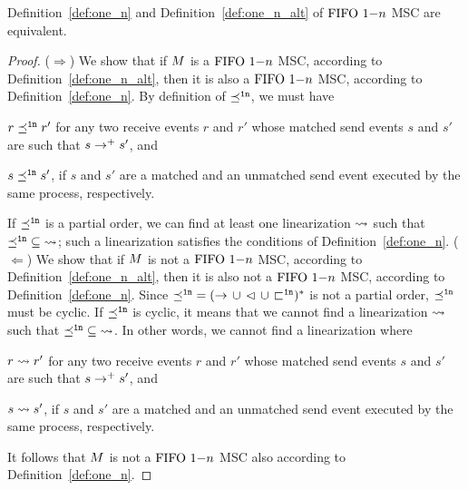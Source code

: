 \begin{proposition}
    Definition~\ref{def:one_n} and Definition~\ref{def:one_n_alt} of $\text{FIFO } 1\mathsf{-}n$ MSC are equivalent.
\end{proposition}
\begin{proof}
    ($\Rightarrow$)  We show that if $M$ is a $\text{FIFO } 1\mathsf{-}n$ MSC, according to Definition~\ref{def:one_n_alt}, then it is also a $\text{FIFO } 1\mathsf{-}n$ MSC, according to Definition~\ref{def:one_n}. By definition of $\preceq^{\mathtt{1n}}$, we must have 
    \begin{enumerate*}[label={(\roman*)}]
        \item $r \preceq^{\mathtt{1n}} r'$ for any two receive events $r$ and $r'$ whose matched send events $s$ and $s'$ are such that $s \to^+ s'$, and
        \item $s \preceq^{\mathtt{1n}} s'$, if $s$ and $s'$ are a matched and an unmatched send event executed by the same process, respectively.
    \end{enumerate*} 
    If $\preceq^{\mathtt{1n}}$ is a partial order, we can find at least one linearization $\rightsquigarrow$ such that $\preceq^{\mathtt{1n}} \;\subseteq\; \rightsquigarrow$; such a linearization satisfies the conditions of Definition~\ref{def:one_n}.\newline
    ($\Leftarrow$) We show that if $M$ is not a $\text{FIFO } 1\mathsf{-}n$ MSC, according to Definition~\ref{def:one_n_alt}, then it is also not a $\text{FIFO } 1\mathsf{-}n$ MSC, according to Definition~\ref{def:one_n}. Since ${\preceq^{\mathtt{1n}}} = ({\to} \,\cup\, {\lhd} \,\cup\, {\sqsubset^{\mathtt{1n}}})^\ast$ is not a partial order, $\preceq^{\mathtt{1n}}$ must be cyclic. If $\preceq^{\mathtt{1n}}$ is cyclic, it means that we cannot find a linearization $\rightsquigarrow$ such that $\preceq^{\mathtt{1n}} \;\subseteq\; \rightsquigarrow$. In other words, we cannot find a linearization where      
    \begin{enumerate*}[label={(\roman*)}]
        \item $r \rightsquigarrow r'$ for any two receive events $r$ and $r'$ whose matched send events $s$ and $s'$ are such that $s \to^+ s'$, and
        \item $s \rightsquigarrow s'$, if $s$ and $s'$ are a matched and an unmatched send event executed by the same process, respectively.
    \end{enumerate*} 
    It follows that $M$ is not a $\text{FIFO } 1\mathsf{-}n$ MSC also according to Definition~\ref{def:one_n}.
\end{proof}